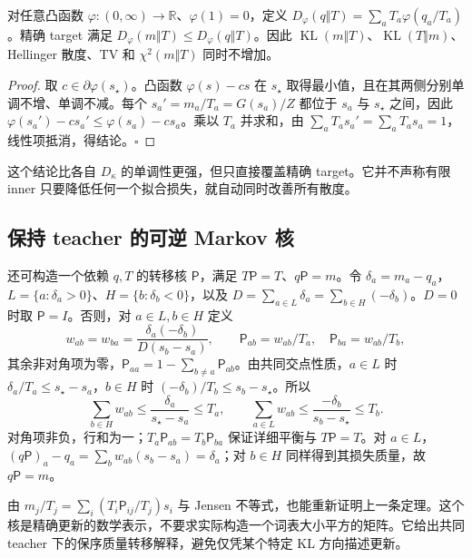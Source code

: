 \documentclass[lang=cn,scheme=chinese,openany]{../book/elegantbook}
\newcommand{\KL}{\operatorname{KL}}
\newcommand{\R}{\mathbb R}
\begin{document}
\begin{theorem}[单教师的凸生成散度单调性]
\label{thm:proximal-all-f-divergences}
对任意凸函数 $\varphi:(0,\infty)\to\R$、$\varphi(1)=0$，定义 $D_\varphi(q\Vert T)=\sum_aT_a\varphi(q_a/T_a)$。精确 target 满足 $D_\varphi(m\Vert T)\le D_\varphi(q\Vert T)$。因此 $\KL(m\Vert T)$、$\KL(T\Vert m)$、Hellinger 散度、TV 和 $\chi^2(m\Vert T)$ 同时不增加。
\end{theorem}

\begin{proof}
取 $c\in\partial\varphi(s_\star)$。凸函数 $\varphi(s)-cs$ 在 $s_\star$ 取得最小值，且在其两侧分别单调不增、单调不减。每个 $s_a'=m_a/T_a=G(s_a)/Z$ 都位于 $s_a$ 与 $s_\star$ 之间，因此 $\varphi(s_a')-cs_a'\le\varphi(s_a)-cs_a$。乘以 $T_a$ 并求和，由 $\sum_aT_as_a'=\sum_aT_as_a=1$，线性项抵消，得结论。\hfill$\square$
\end{proof}

这个结论比各自 $D_\kappa$ 的单调性更强，但只直接覆盖精确 target。它并不声称有限 inner 只要降低任何一个拟合损失，就自动同时改善所有散度。
\subsection{保持 teacher 的可逆 Markov 核}

还可构造一个依赖 $q,T$ 的转移核 $\mathsf{P}$，满足 $T \mathsf{P}=T$、$q\mathsf{P}=m$。令 $\delta_a=m_a-q_a$，$L=\{a:\delta_a>0\}$、$H=\{b:\delta_b<0\}$，以及 $D=\sum_{a\in L}\delta_a=\sum_{b\in H}(-\delta_b)$。$D=0$ 时取 $\mathsf{P}=I$。否则，对 $a\in L,b\in H$ 定义
\begin{equation}
 w_{ab}=w_{ba}=\frac{\delta_a(-\delta_b)}{D(s_b-s_a)},\qquad
 \mathsf{P}_{ab}=w_{ab}/T_a,\quad \mathsf{P}_{ba}=w_{ab}/T_b,
\end{equation}
其余非对角项为零，$\mathsf{P}_{aa}=1-\sum_{b\ne a}\mathsf{P}_{ab}$。由共同交点性质，$a\in L$ 时 $\delta_a/T_a\le s_\star-s_a$，$b\in H$ 时 $(-\delta_b)/T_b\le s_b-s_\star$。所以
\begin{equation}
 \sum_{b\in H}w_{ab}\le\frac{\delta_a}{s_\star-s_a}\le T_a,\qquad
 \sum_{a\in L}w_{ab}\le\frac{-\delta_b}{s_b-s_\star}\le T_b.
\end{equation}
对角项非负，行和为一；$T_a\mathsf{P}_{ab}=T_b\mathsf{P}_{ba}$ 保证详细平衡与 $T \mathsf{P}=T$。对 $a\in L$，$(q\mathsf{P})_a-q_a=\sum_b w_{ab}(s_b-s_a)=\delta_a$；对 $b\in H$ 同样得到其损失质量，故 $q\mathsf{P}=m$。

由 $m_j/T_j=\sum_i(T_i\mathsf{P}_{ij}/T_j)s_i$ 与 Jensen 不等式，也能重新证明上一条定理。这个核是精确更新的数学表示，不要求实际构造一个词表大小平方的矩阵。它给出共同 teacher 下的保序质量转移解释，避免仅凭某个特定 KL 方向描述更新。
\end{document}
